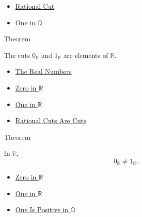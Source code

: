 \begin{dependencies}
\begin{itemize}
  \item \hyperref[def:rational-cut]{Rational Cut}
  \item \hyperref[def:one-in-q]{One in $\mathbb{Q}$}
\end{itemize}
\end{dependencies}

\begin{theorembox}{Theorem}
\begin{theorem}
\label{thm:zero-one-are-reals}
The cuts $0_{\mathbb{R}}$ and $1_{\mathbb{R}}$ are elements of $\mathbb{R}$.
\end{theorem}
\end{theorembox}

\begin{dependencies}
\begin{itemize}
  \item \hyperref[def:reals]{The Real Numbers}
  \item \hyperref[def:zero-in-r]{Zero in $\mathbb{R}$}
  \item \hyperref[def:one-in-r]{One in $\mathbb{R}$}
  \item \hyperref[lem:rational-cut-is-a-cut]{Rational Cuts Are Cuts}
\end{itemize}
\end{dependencies}

\begin{theorembox}{Theorem}
\begin{theorem}
\label{thm:zero-not-one-in-r}
In $\mathbb{R}$,
\[
0_{\mathbb{R}}\ne 1_{\mathbb{R}}.
\]
\end{theorem}
\end{theorembox}

\begin{dependencies}
\begin{itemize}
  \item \hyperref[def:zero-in-r]{Zero in $\mathbb{R}$}
  \item \hyperref[def:one-in-r]{One in $\mathbb{R}$}
  \item \hyperref[cor:one-positive-on-q]{One Is Positive in $\mathbb{Q}$}
\end{itemize}
\end{dependencies}
